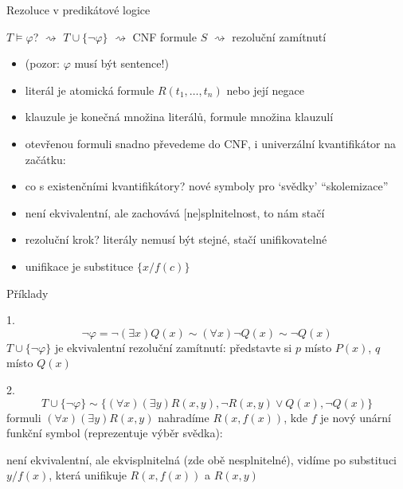 \documentclass{beamer}
\begin{document}
\begin{frame}{Rezoluce v predikátové logice}

    $T\models\varphi$? {\Large$\rightsquigarrow$} $T\cup\{\neg \varphi\}$ {\Large$\rightsquigarrow$} CNF formule $S$ {\Large$\rightsquigarrow$} rezoluční zamítnutí

    \begin{itemize}
        \item[] (pozor: $\varphi$ musí být \alert{sentence}!)        
        \item \alert{literál} je \alert{atomická formule} $R(t_1,\dots,t_n)$ nebo její negace
        \item \alert{klauzule} je konečná množina literálů, \alert{formule} množina klauzulí
        \item otevřenou formuli snadno převedeme do CNF, i univerzální kvantifikátor na začátku:{\small{}}
        \item co s existenčními kvantifikátory? nové symboly pro `svědky'
        {\small{}} ``\alert{skolemizace}''
        \item není ekvivalentní, ale zachovává \alert{[ne]splnitelnost}, to nám stačí
        \item rezoluční krok? literály nemusí být stejné, stačí \alert{unifikovatelné}
        {}
        \item \alert{unifikace} je substituce $\{x/f(c)\}$
    \end{itemize}

\end{frame}


\begin{frame}{Příklady}
    
    1. 
    $$\neg\varphi=\neg(\exists x)Q(x)\sim(\forall x)\neg Q(x)\sim\neg Q(x)$$ 
    $T\cup\{\neg \varphi\}$ je \alert{ekvivalentní} 
    rezoluční zamítnutí: představte si $p$ místo $P(x)$, $q$ místo $Q(x)$

    2. 
    $$
    T\cup\{\neg \varphi\}\sim\{(\forall x)(\exists y)R(x,y),\neg R(x,y)\lor Q(x),\neg Q(x)\}
    $$
    formuli \alert{$(\forall x)(\exists y)R(x,y)$} nahradíme \alert{$R(x,f(x))$}, kde $f$ je nový unární funkční symbol (reprezentuje \alert{výběr svědka}):


    není ekvivalentní, ale \alert{ekvisplnitelná} (zde obě nesplnitelné), vidíme po \alert{substituci $y/f(x)$}, která \alert{unifikuje} $R(x,f(x))$ a $R(x,y)$
 
\end{frame}
\end{document}
